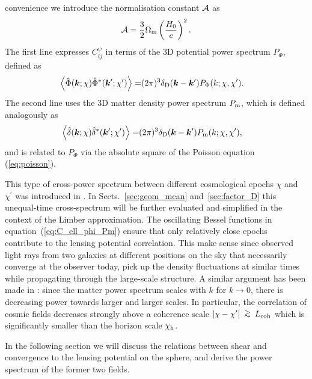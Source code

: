 \documentclass[fleqn,usenatbib]{mnras} %
\newcommand{\pref}{{\cal A}}
\renewcommand{\vec}{\bm}
\newcommand{\ontop}[2]{
  \renewcommand{\arraystretch}{0.2}
  \begin{array}{c}
  #1 \\ #2
  \end{array}
  \renewcommand{\arraystretch}{1.0}
}
\newcommand{\gsim}{\ontop{>}{\sim}}
\begin{document}
convenience we introduce the normalisation constant $\pref$ as
%
\begin{equation}
  \pref = \frac 3 2 \Omega_{\rm m} \left(\frac{H_0} c\right)^2.
  \label{eq:pref}
\end{equation}
%
The first line expresses $C_{ij}^\psi$ in terms of the 3D potential power spectrum $P_\Phi$, defined as
%
\begin{align}
  \left\langle \hat \Phi(\vec k; \chi) \hat \Phi^\ast(\vec k^\prime; \chi^\prime) \right\rangle
    = & (2\pi)^3 \delta_{\rm D}(\vec k - \vec k^\prime) P_\Phi(k; \chi, \chi^\prime).
  \label{eq:p_phi}
\end{align}
%
The second line uses the 3D matter density power spectrum $P_{\rm m}$, which is defined analogously as
%
\begin{align}
  \left\langle \hat \delta(\vec k; \chi) \hat \delta^\ast(\vec k^\prime; \chi^\prime) \right\rangle
    = & (2\pi)^3 \delta_{\rm D}(\vec k - \vec k^\prime) P_{\rm m}(k; \chi, \chi^\prime),
  \label{eq:p_m}
\end{align}
%
and is related to $P_\Phi$ via the absolute square of the Poisson equation
(\ref{eq:poisson}).

This type of cross-power spectrum between different cosmological epochs
$\chi$ and $\chi^\prime$ was introduced in \cite{2005PhRvD..72b3516C}. In
Sects.~\ref{sec:geom_mean} and~\ref{sec:factor_D} this unequal-time
cross-spectrum \citep{2016arXiv161200770K} will be further evaluated and
simplified in the context of the Limber approximation. The oscillating Bessel
functions in equation~(\ref{eq:C_ell_phi_Pm}) ensure that only relatively close epochs
contribute to the lensing potential correlation. This make sense since observed
light rays from two galaxies at different positions on the sky that necessarily
converge at the observer today, pick up the density fluctuations at similar
times while propagating through the large-scale structure. A similar argument
has been made in \cite{BS01}: since the matter power spectrum scales with $k$
for $k \rightarrow 0$, there is decreasing power towards larger and larger
scales. In particular, the correlation of cosmic fields decreases strongly
above a coherence scale $|\chi - \chi^\prime| \gsim L_{\rm coh}$ which is significantly
smaller than the horizon scale $\chi_{\rm h}$.

In the following section we will discuss the relations between shear and
convergence to the lensing potential on the sphere, and derive the power
spectrum of the former two fields.
\end{document}
